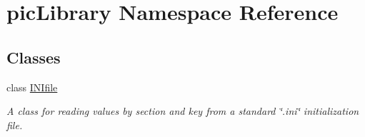 \hypertarget{namespacepic_library}{}\section{pic\+Library Namespace Reference}
\label{namespacepic_library}
\subsection*{Classes}
\begin{DoxyCompactItemize}
\item 
class \mbox{\hyperlink{classpic_library_1_1_i_n_ifile}{I\+N\+Ifile}}
\begin{DoxyCompactList}\small\item\em A class for reading values by section and key from a standard \char`\"{}.\+ini\char`\"{} initialization file. \end{DoxyCompactList}\end{DoxyCompactItemize}
